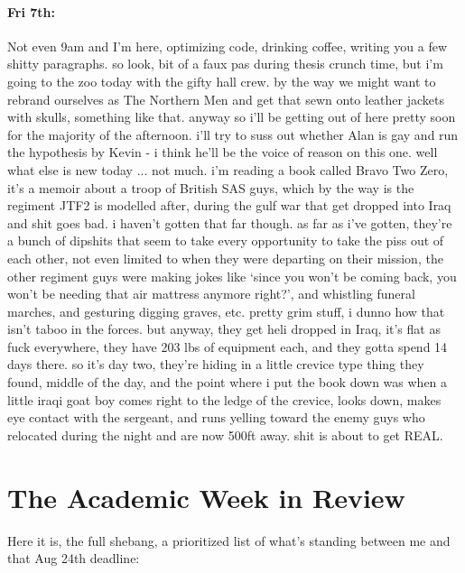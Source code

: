 \documentclass[12pt]{article}
\begin{document}
\paragraph{Fri 7th:} Not even 9am and I'm here, optimizing code, drinking coffee, writing you a few shitty paragraphs. so look, bit of a faux pas during thesis crunch time, but i'm going to the zoo today with the gifty hall crew. by the way we might want to rebrand ourselves as The Northern Men and get that sewn onto leather jackets with skulls, something like that. anyway so i'll be getting out of here pretty soon for the majority of the afternoon. i'll try to suss out whether Alan is gay and run the hypothesis by Kevin - i think he'll be the voice of reason on this one. well what else is new today ... not much. i'm reading a book called Bravo Two Zero, it's a memoir about a troop of British SAS guys, which by the way is the regiment JTF2 is modelled after, during the gulf war that get dropped into Iraq and shit goes bad. i haven't gotten that far though. as far as i've gotten, they're a bunch of dipshits that seem to take every opportunity to take the piss out of each other, not even limited to when they were departing on their mission, the other regiment guys were making jokes like `since you won't be coming back, you won't be needing that air mattress anymore right?', and whistling funeral marches, and gesturing digging graves, etc. pretty grim stuff, i dunno how that isn't taboo in the forces. but anyway, they get heli dropped in Iraq, it's flat as fuck everywhere, they have 203 lbs of equipment each, and they gotta spend 14 days there. so it's day two, they're hiding in a little crevice type thing they found, middle of the day, and the point where i put the book down was when a little iraqi goat boy comes right to the ledge of the crevice, looks down, makes eye contact with the sergeant, and runs yelling toward the enemy guys who relocated during the night and are now 500ft away. shit is about to get REAL.

\section*{The Academic Week in Review}
Here it is, the full shebang, a prioritized list of what's standing between me and that Aug 24th deadline:
\end{document}
